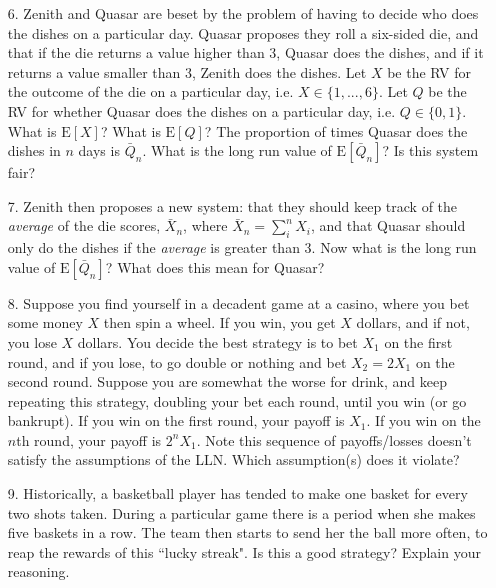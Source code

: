 \documentclass[10pt]{extarticle}
\newcommand{\E}{\text{E}}
\begin{document}
\begin{itemize}

	\item[6.] Zenith and Quasar are beset by the problem of having to decide who does the dishes on a particular day. Quasar proposes they roll a six-sided die, and that if the die returns a value higher than 3, Quasar does the dishes, and if it returns a value smaller than 3, Zenith does the dishes. Let $X$ be the RV for the outcome of the die on a particular day, i.e. $X \in \{1,...,6\}$. Let $Q$ be the RV for whether Quasar does the dishes on a particular day, i.e. $Q \in \{0,1 \}$. What is $\E[X]$? What is $\E[Q]$? The proportion of times Quasar does the dishes in $n$ days is $\bar Q_n$. What is the long run value of $\E[\bar Q_n]$? Is this system fair? \\ 

	\item[7.] Zenith then proposes a new system: that they should keep track of the {\it average} of the die scores, $\bar X_n$, where $\bar X_n = \sum_i^n  X_i$, and that Quasar should only do the dishes if the {\it average} is greater than 3. Now what is the long run value of $\E[\bar Q_n]$? What does this mean for Quasar? \\ 

	\item[8.] Suppose you find yourself in a decadent game at a casino, where you bet some money $X$ then spin a wheel. If you win, you get $X$ dollars, and if not, you lose $X$ dollars. You decide the best strategy is to bet $X_1$ on the first round, and if you lose, to go double or nothing and bet $X_2 = 2X_1$ on the second round. Suppose you are somewhat the worse for drink, and keep repeating this strategy, doubling your bet each round, until you win (or go bankrupt). If you win on the first round, your payoff is $X_1$. If you win on the $n$th  round, your payoff is $2^n X_1$. Note this sequence of payoffs/losses doesn't satisfy the assumptions of the LLN. Which assumption(s) does it violate? \\ 

	\item[9.] Historically, a basketball player has tended to make one basket for every two shots taken. During a particular game there is a period when she makes five baskets in a row. The team then starts to send her the ball more often, to reap the rewards of this ``lucky streak". Is this a good strategy? Explain your reasoning.  

\end{itemize}
\end{document}
